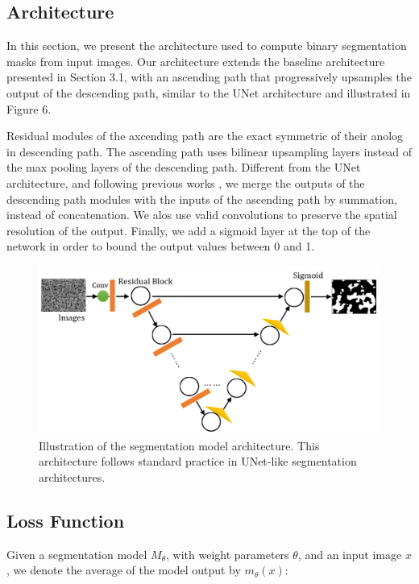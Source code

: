 \documentclass[10pt,twocolumn,letterpaper]{article}
\begin{document}
\subsection{Architecture}

% 
In this section, we present the architecture used 
to compute binary segmentation masks from input images.
Our architecture extends the baseline architecture presented in Section 3.1,
with an ascending path that progressively upsamples the output
of the descending path, similar to the UNet architecture \cite{ronneberger2015u} and illustrated in Figure 6.

Residual modules of the axcending path are the exact symmetric of their anolog in descending path.
The ascending path uses bilinear upsampling layers 
instead of the max pooling layers of the descending path.
Different from the UNet architecture, and following previous works \cite{xxx},
we merge the outputs of the descending path modules with the inputs of the ascending path 
by summation, instead of concatenation. 
We alos use valid convolutions to preserve the spatial resolution of the output.
Finally, we add a sigmoid layer at the top of the network in order to bound the output values between 0 and 1.

\begin{figure}[h]
\centering
\includegraphics[width=0.9\linewidth]{"./figures/Figure6"}
\caption{
Illustration of the segmentation model architecture.
This architecture follows standard practice in 
UNet-like segmentation architectures.
}
\end{figure}

\subsection{Loss Function}

Given a segmentation model $M_{\theta}$, 
with weight parameters $\theta$, 
and an input image $x$,
we denote the average of the model output by $m_{\theta}(x)$:
\end{document}
